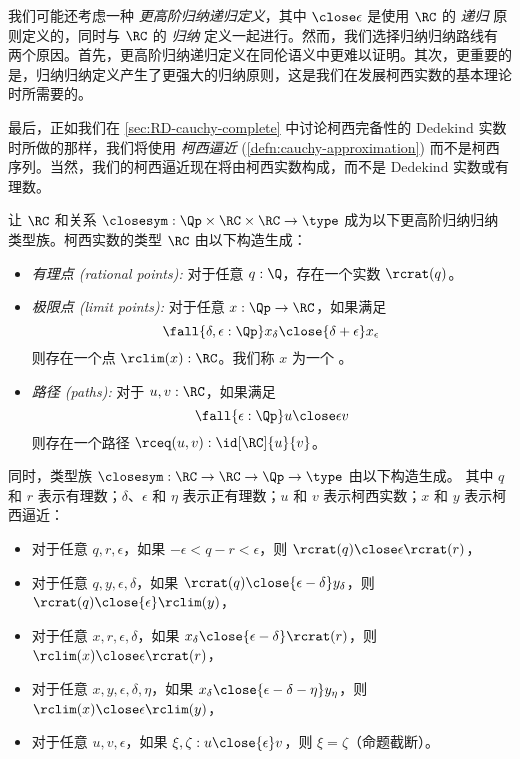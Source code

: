 \begin{rmk}
  我们可能还考虑一种 \emph{更高阶归纳递归定义}，其中 $\close\epsilon$ 是使用 $\RC$ 的 \emph{递归} 原则定义的，同时与 $\RC$ 的 \emph{归纳} 定义一起进行。然而，我们选择归纳归纳路线有两个原因。首先，更高阶归纳递归定义在同伦语义中更难以证明。其次，更重要的是，归纳归纳定义产生了更强大的归纳原则，这是我们在发展柯西实数的基本理论时所需要的。
\end{rmk}

最后，正如我们在 \cref{sec:RD-cauchy-complete} 中讨论柯西完备性的 Dedekind 实数时所做的那样，我们将使用 \emph{柯西逼近} (\cref{defn:cauchy-approximation}) 而不是柯西序列。当然，我们的柯西逼近现在将由柯西实数构成，而不是 Dedekind 实数或有理数。

\begin{defn}\label{defn:cauchy-reals}
让 $\RC$ 和关系 $\closesym:\Qp \times \RC \times \RC \to \type$ 成为以下更高阶归纳归纳类型族。柯西实数的类型 $\RC$
%
由以下构造生成：
\begin{itemize}
  \item \emph{有理点 (rational points):}
  对于任意 $q : \Q$，存在一个实数 $\rcrat(q)$。
  \item \emph{极限点 (limit points):}
  对于任意 $x : \Qp \to \RC$，如果满足
  \begin{equation}
    \label{eq:RC-cauchy}
    \fall{\delta, \epsilon : \Qp} x_\delta \close{\delta + \epsilon} x_\epsilon
  \end{equation}
  则存在一个点 $\rclim(x) : \RC$。我们称 $x$ 为一个 。
  \item \emph{路径 (paths):}
  对于 $u, v : \RC$，如果满足
  \begin{equation}
    \label{eq:RC-path}
    \fall{\epsilon : \Qp} u \close\epsilon v
  \end{equation}
  则存在一个路径 $\rceq(u, v) : \id[\RC]{u}{v}$。
\end{itemize}
同时，类型族 $\closesym:\RC\to\RC\to\Qp \to\type$ 由以下构造生成。
其中 $q$ 和 $r$ 表示有理数；$\delta$、$\epsilon$ 和 $\eta$ 表示正有理数；$u$ 和 $v$ 表示柯西实数；$x$ 和 $y$ 表示柯西逼近：
\begin{itemize}
  \item 对于任意 $q,r,\epsilon$，如果 $-\epsilon < q - r < \epsilon$，则 $\rcrat(q) \close\epsilon \rcrat(r)$，
  \item 对于任意 $q,y,\epsilon,\delta$，如果 $\rcrat(q) \close{\epsilon - \delta} y_\delta$，则 $\rcrat(q) \close{\epsilon} \rclim(y)$，
  \item 对于任意 $x,r,\epsilon,\delta$，如果 $x_\delta \close{\epsilon - \delta} \rcrat(r)$，则 $\rclim(x) \close\epsilon \rcrat(r)$，
  \item 对于任意 $x,y,\epsilon,\delta,\eta$，如果 $x_\delta \close{\epsilon - \delta - \eta} y_\eta$，则 $\rclim(x) \close\epsilon \rclim(y)$，
  \item 对于任意 $u,v,\epsilon$，如果 $\xi,\zeta : u \close{\epsilon} v$，则 $\xi=\zeta$（命题截断）。
\end{itemize}
\end{defn}

